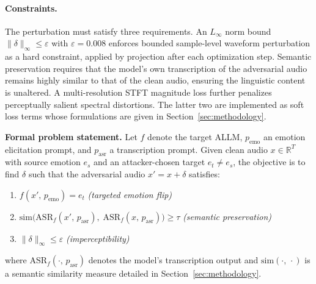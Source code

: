 \paragraph{Constraints.}
The perturbation must satisfy three requirements.
An $L_\infty$ norm bound $\|\delta\|_\infty \leq \varepsilon$ with $\varepsilon = 0.008$ enforces bounded sample-level waveform perturbation as a hard constraint, applied by projection after each optimization step.
Semantic preservation requires that the model's own transcription of the adversarial audio remains highly similar to that of the clean audio, ensuring the linguistic content is unaltered.
A multi-resolution STFT magnitude loss further penalizes perceptually salient spectral distortions.
The latter two are implemented as soft loss terms whose formulations are given in Section~\ref{sec:methodology}.

\medskip\noindent
\textbf{Formal problem statement.}
Let $f$ denote the target ALLM, $p_{\text{emo}}$ an emotion elicitation prompt, and $p_{\text{asr}}$ a transcription prompt.
Given clean audio $x \in \mathbb{R}^T$ with source emotion $e_s$ and an attacker-chosen target $e_t \neq e_s$, the objective is to find $\delta$ such that the adversarial audio $x' = x + \delta$ satisfies:
%
\begin{enumerate}
    \item[\textnormal{(i)}] $f(x',\, p_{\text{emo}}) = e_t$ \hfill \textit{(targeted emotion flip)}
    \item[\textnormal{(ii)}] $\mathrm{sim}\!\bigl(\mathrm{ASR}_{f}(x',\, p_{\text{asr}}),\; \mathrm{ASR}_{f}(x,\, p_{\text{asr}})\bigr) \geq \tau$ \hfill \textit{(semantic preservation)}
    \item[\textnormal{(iii)}] $\|\delta\|_\infty \leq \varepsilon$ \hfill \textit{(imperceptibility)}
\end{enumerate}
%
where $\mathrm{ASR}_{f}(\cdot,\, p_{\text{asr}})$ denotes the model's transcription output and $\mathrm{sim}(\cdot,\,\cdot)$ is a semantic similarity measure detailed in Section~\ref{sec:methodology}.
